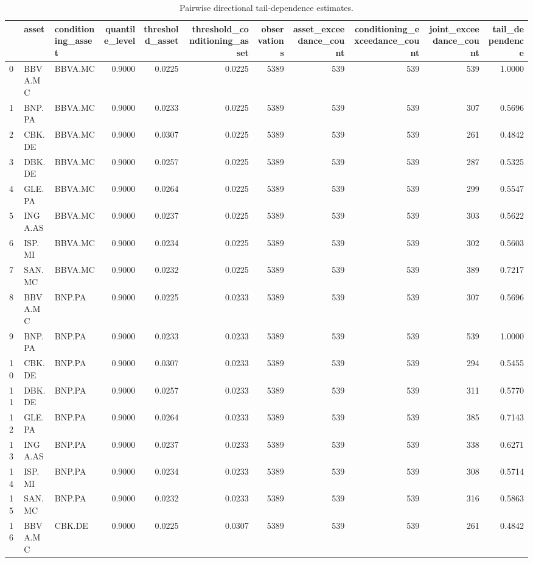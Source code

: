 \begin{table}
\caption{Pairwise directional tail-dependence estimates.}
\label{tab:tail_dependence_pairwise}
\begin{tabular}{lllrrrrrrrr}
\toprule
 & asset & conditioning_asset & quantile_level & threshold_asset & threshold_conditioning_asset & observations & asset_exceedance_count & conditioning_exceedance_count & joint_exceedance_count & tail_dependence \\
\midrule
0 & BBVA.MC & BBVA.MC & 0.9000 & 0.0225 & 0.0225 & 5389 & 539 & 539 & 539 & 1.0000 \\
1 & BNP.PA & BBVA.MC & 0.9000 & 0.0233 & 0.0225 & 5389 & 539 & 539 & 307 & 0.5696 \\
2 & CBK.DE & BBVA.MC & 0.9000 & 0.0307 & 0.0225 & 5389 & 539 & 539 & 261 & 0.4842 \\
3 & DBK.DE & BBVA.MC & 0.9000 & 0.0257 & 0.0225 & 5389 & 539 & 539 & 287 & 0.5325 \\
4 & GLE.PA & BBVA.MC & 0.9000 & 0.0264 & 0.0225 & 5389 & 539 & 539 & 299 & 0.5547 \\
5 & INGA.AS & BBVA.MC & 0.9000 & 0.0237 & 0.0225 & 5389 & 539 & 539 & 303 & 0.5622 \\
6 & ISP.MI & BBVA.MC & 0.9000 & 0.0234 & 0.0225 & 5389 & 539 & 539 & 302 & 0.5603 \\
7 & SAN.MC & BBVA.MC & 0.9000 & 0.0232 & 0.0225 & 5389 & 539 & 539 & 389 & 0.7217 \\
8 & BBVA.MC & BNP.PA & 0.9000 & 0.0225 & 0.0233 & 5389 & 539 & 539 & 307 & 0.5696 \\
9 & BNP.PA & BNP.PA & 0.9000 & 0.0233 & 0.0233 & 5389 & 539 & 539 & 539 & 1.0000 \\
10 & CBK.DE & BNP.PA & 0.9000 & 0.0307 & 0.0233 & 5389 & 539 & 539 & 294 & 0.5455 \\
11 & DBK.DE & BNP.PA & 0.9000 & 0.0257 & 0.0233 & 5389 & 539 & 539 & 311 & 0.5770 \\
12 & GLE.PA & BNP.PA & 0.9000 & 0.0264 & 0.0233 & 5389 & 539 & 539 & 385 & 0.7143 \\
13 & INGA.AS & BNP.PA & 0.9000 & 0.0237 & 0.0233 & 5389 & 539 & 539 & 338 & 0.6271 \\
14 & ISP.MI & BNP.PA & 0.9000 & 0.0234 & 0.0233 & 5389 & 539 & 539 & 308 & 0.5714 \\
15 & SAN.MC & BNP.PA & 0.9000 & 0.0232 & 0.0233 & 5389 & 539 & 539 & 316 & 0.5863 \\
16 & BBVA.MC & CBK.DE & 0.9000 & 0.0225 & 0.0307 & 5389 & 539 & 539 & 261 & 0.4842 \\

\end{tabular}
\end{table}
